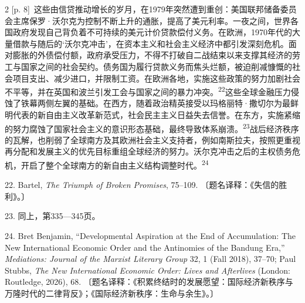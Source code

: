 \documentclass[10pt,a4paper]{article}
\begin{document}
\begin{paracol}{2}
{\scriptsize\color{gray} [p. 8]}\ 这些由信贷推动增长的岁月，在1979年突然遭到重创：美国联邦储备委员会主席保罗·沃尔克为控制不断上升的通胀，提高了美元利率。一夜之间，世界各国政府发现自己背负着不可持续的美元计价贷款偿付义务。在欧洲，1970年代的大量借款与随后的‘沃尔克冲击’，在资本主义和社会主义经济中都引发深刻危机。面对膨胀的外债偿付额，政府承受压力，不得不打破自二战结束以来支撑其经济的劳工与国家之间的社会契约。债务国为履行贷款义务而焦头烂额，被迫削减慷慨的社会项目支出、减少进口，并限制工资。在欧洲各地，实施这些政策的努力加剧社会不平等，并在英国和波兰引发工会与国家之间的暴力冲\mbox{突。\textsuperscript{22}}这些全球金融压力侵蚀了铁幕两侧左翼的基础。在西方，随着政治精英接受以玛格丽特·撒切尔为最鲜明代表的新自由主义改革新范式，社会民主主义日益失去信誉。在东方，实施紧缩的努力腐蚀了国家社会主义的意识形态基础，最终导致体系崩\mbox{溃。\textsuperscript{23}}战后经济秩序的瓦解，也削弱了全球南方及其欧洲社会主义支持者，例如南斯拉夫，按照更重视再分配和发展主义的优先目标重组全球经济的努力。沃尔克冲击之后的主权债务危机，开启了整个全球南方的新自由主义结构调整时\mbox{代。\textsuperscript{24}}\par{\small 22. Bartel, \textit{The Triumph of Broken Promises}, 75–109. 〔题名译释：《失信的胜利》。〕\par}{\small 23. 同上，第335—345页。\par}{\small 24. Bret Benjamin, “Developmental Aspiration at the End of Accumulation: The New International Economic Order and the Antinomies of the Bandung Era,” \textit{Mediations: Journal of the Marxist Literary Group} 32, 1 (Fall 2018), 37–70; Paul Stubbs, \textit{The New International Economic Order: Lives and Afterlives} (London: Routledge, 2026), 68. 〔题名译释：《积累终结时的发展愿望：国际经济新秩序与万隆时代的二律背反》；《国际经济新秩序：生命与余生》。〕\par}
\switchcolumn

\end{paracol}
\end{document}
